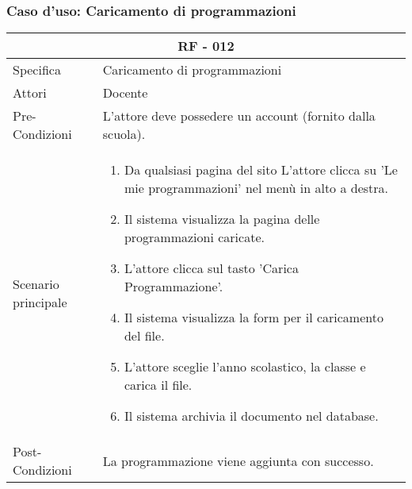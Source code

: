 \documentclass{article}
\begin{document}
\subsubsection{\textbf{Caso d'uso: Caricamento di programmazioni}}
\begin{tabular}{ |p{3cm}|p{9cm}|  }
	\hline
	\multicolumn{2}{|c|}{\textbf{RF - 012}} \\
	\hline
	Specifica& Caricamento di programmazioni\\
	\hline
	Attori& Docente\\
	\hline
	Pre-Condizioni& L'attore deve possedere un account (fornito dalla scuola).\\
	\hline
	Scenario principale& \begin{enumerate}
		\item Da qualsiasi pagina del sito L'attore clicca su 'Le mie programmazioni' nel menù in alto a destra.
		\item Il sistema visualizza la pagina delle programmazioni caricate.
		\item L'attore clicca sul tasto 'Carica Programmazione'.
		\item Il sistema visualizza la form per il caricamento del file.
		\item L'attore sceglie l'anno scolastico, la classe e carica il file.
		\item Il sistema archivia il documento nel database.
	\end{enumerate}\\
	\hline
	Post-Condizioni& La programmazione viene aggiunta con successo.\\
	\hline
\end{tabular}
\end{document}
